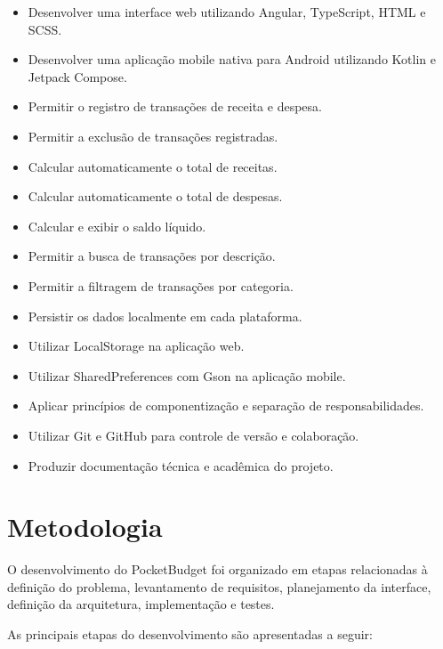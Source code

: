 \documentclass[12pt,a4paper]{article}
\begin{document}
\begin{itemize}
    \item Desenvolver uma interface web utilizando Angular, TypeScript, HTML e SCSS.
    \item Desenvolver uma aplicação mobile nativa para Android utilizando Kotlin e Jetpack Compose.
    \item Permitir o registro de transações de receita e despesa.
    \item Permitir a exclusão de transações registradas.
    \item Calcular automaticamente o total de receitas.
    \item Calcular automaticamente o total de despesas.
    \item Calcular e exibir o saldo líquido.
    \item Permitir a busca de transações por descrição.
    \item Permitir a filtragem de transações por categoria.
    \item Persistir os dados localmente em cada plataforma.
    \item Utilizar LocalStorage na aplicação web.
    \item Utilizar SharedPreferences com Gson na aplicação mobile.
    \item Aplicar princípios de componentização e separação de responsabilidades.
    \item Utilizar Git e GitHub para controle de versão e colaboração.
    \item Produzir documentação técnica e acadêmica do projeto.
\end{itemize}

\section{Metodologia}

O desenvolvimento do PocketBudget foi organizado em etapas relacionadas à definição do problema, levantamento de requisitos, planejamento da interface, definição da arquitetura, implementação e testes.

As principais etapas do desenvolvimento são apresentadas a seguir:
\end{document}
